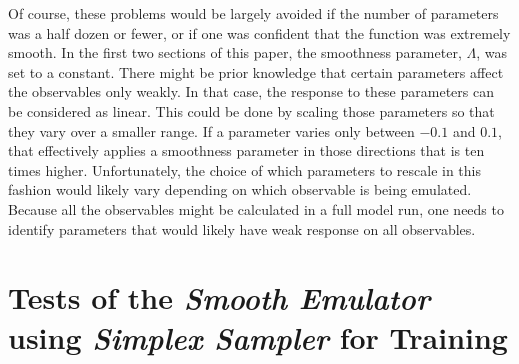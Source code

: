 \documentclass[main.tex]{subfiles}
\begin{document}
Of course, these problems would be largely avoided if the number of parameters was a half dozen or fewer, or if one was confident that the function was extremely smooth. In the first two sections of this paper, the smoothness parameter, $\Lambda$, was set to a constant. There might be prior knowledge that certain parameters affect the observables only weakly. In that case, the response to these parameters can be considered as linear. This could be done by scaling those parameters so that they vary over a smaller range. If a parameter varies only between $-0.1$ and $0.1$, that effectively applies a smoothness parameter in those directions that is ten times higher. Unfortunately, the choice of which parameters to rescale in this fashion would likely vary depending on which observable is being emulated. Because all the observables might be calculated in a full model run, one needs to identify parameters that would likely have weak response on all observables. 

\section{Tests of the {\it Smooth Emulator} using {\it Simplex Sampler} for Training}
\end{document}
